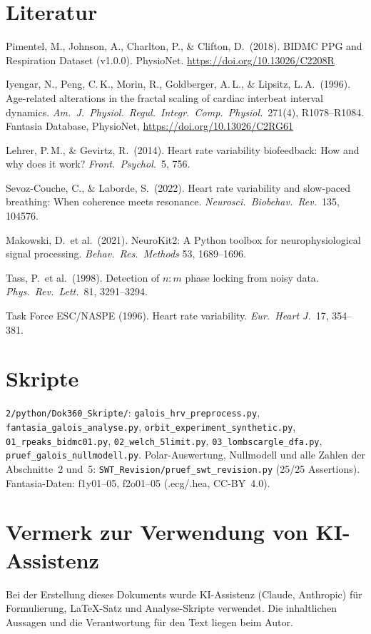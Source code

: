 \section*{Literatur}

\begin{description}[leftmargin=2em,labelwidth=1.8em]
\item[{[Pim18]}] Pimentel, M., Johnson, A., Charlton, P., \& Clifton, D.\ (2018).
  BIDMC PPG and Respiration Dataset (v1.0.0). PhysioNet.
  \url{https://doi.org/10.13026/C2208R}
\item[{[Iye96]}] Iyengar, N., Peng, C.\,K., Morin, R., Goldberger, A.\,L., \&
  Lipsitz, L.\,A.\ (1996). Age-related alterations in the fractal scaling of
  cardiac interbeat interval dynamics. \emph{Am.\ J.\ Physiol.\ Regul.\ Integr.\
  Comp.\ Physiol.}\ 271(4), R1078--R1084. Fantasia Database, PhysioNet,
  \url{https://doi.org/10.13026/C2RG61}
\item[{[Leh14]}] Lehrer, P.\,M., \& Gevirtz, R.\ (2014). Heart rate variability
  biofeedback: How and why does it work? \emph{Front.\ Psychol.}\ 5, 756.
\item[{[Sev22]}] Sevoz-Couche, C., \& Laborde, S.\ (2022). Heart rate
  variability and slow-paced breathing: When coherence meets resonance.
  \emph{Neurosci.\ Biobehav.\ Rev.}\ 135, 104576.
\item[{[Mak21]}] Makowski, D.\ et al.\ (2021). NeuroKit2: A Python toolbox for
  neurophysiological signal processing. \emph{Behav.\ Res.\ Methods} 53,
  1689--1696.
\item[{[Tas98]}] Tass, P.\ et al.\ (1998). Detection of $n{:}m$ phase locking
  from noisy data. \emph{Phys.\ Rev.\ Lett.}\ 81, 3291--3294.
\item[{[TF96]}] Task Force ESC/NASPE (1996). Heart rate variability.
  \emph{Eur.\ Heart J.}\ 17, 354--381.
\end{description}

\section*{Skripte}

\texttt{2/python/Dok360\_Skripte/}:
\texttt{galois\_hrv\_preprocess.py},
\texttt{fantasia\_galois\_analyse.py},
\texttt{orbit\_experiment\_synthetic.py},
\texttt{01\_rpeaks\_bidmc01.py},
\texttt{02\_welch\_5limit.py},
\texttt{03\_lombscargle\_dfa.py},
\texttt{pruef\_galois\_nullmodell.py}.
Polar-Auswertung, Nullmodell und alle Zahlen der Abschnitte~2 und~5:
\texttt{SWT\_Revision/pruef\_swt\_revision.py} (25/25 Assertions).
Fantasia-Daten: f1y01--05, f2o01--05 (.ecg/.hea, CC-BY~4.0).

\section*{Vermerk zur Verwendung von KI-Assistenz}

Bei der Erstellung dieses Dokuments wurde KI-Assistenz (Claude, Anthropic)
für Formulierung, LaTeX-Satz und Analyse-Skripte verwendet.
Die inhaltlichen Aussagen und die Verantwortung für den Text
liegen beim Autor.
